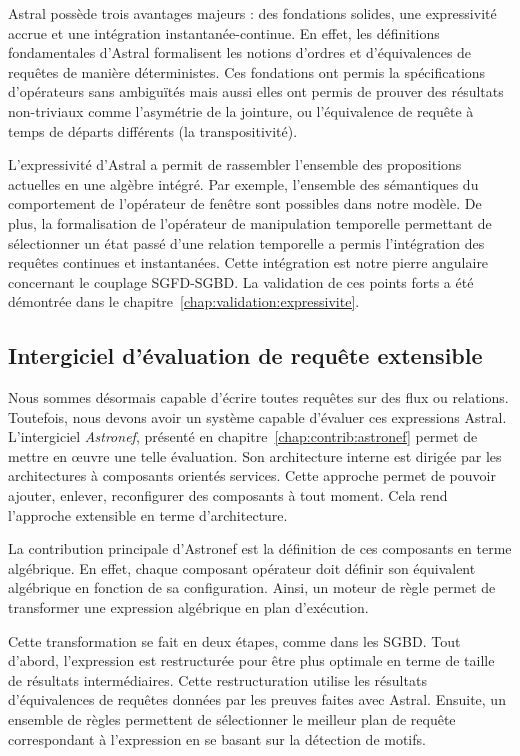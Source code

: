 Astral possède trois avantages majeurs : des fondations solides, une expressivité accrue et une intégration instantanée-continue. En effet, les définitions fondamentales d'Astral formalisent les notions d'ordres et d'équivalences de requêtes de manière déterministes. Ces fondations ont permis la spécifications d'opérateurs sans ambiguïtés mais aussi elles ont permis de prouver des résultats non-triviaux comme l'asymétrie de la jointure, ou l'équivalence de requête à temps de départs différents (la transpositivité).

L'expressivité d'Astral a permit de rassembler l'ensemble des propositions actuelles en une algèbre intégré. Par exemple, l'ensemble des sémantiques du comportement de l'opérateur de fenêtre sont possibles dans notre modèle. De plus, la formalisation de l'opérateur de manipulation temporelle permettant de sélectionner un état passé d'une relation temporelle a permis l'intégration des requêtes continues et instantanées. Cette intégration est notre pierre angulaire concernant le couplage SGFD-SGBD. La validation de ces points forts a été démontrée dans le chapitre~\ref{chap:validation:expressivite}.

\subsection{Intergiciel d'évaluation de requête extensible}
Nous sommes désormais capable d'écrire toutes requêtes sur des flux ou relations. Toutefois, nous devons avoir un système capable d'évaluer ces expressions Astral. L'intergiciel \textit{Astronef}, présenté en chapitre~\ref{chap:contrib:astronef} permet de mettre en œuvre une telle évaluation. Son architecture interne est dirigée par les architectures à composants orientés services. Cette approche permet de pouvoir ajouter, enlever, reconfigurer des composants à tout moment. Cela rend l'approche extensible en terme d'architecture.

La contribution principale d'Astronef est la définition de ces composants en terme algébrique. En effet, chaque composant opérateur doit définir son équivalent algébrique en fonction de sa configuration. Ainsi, un moteur de règle permet de transformer une expression algébrique en plan d'exécution.

Cette transformation se fait en deux étapes, comme dans les SGBD. Tout d'abord, l'expression est restructurée pour être plus optimale en terme de taille de résultats intermédiaires. Cette restructuration utilise les résultats d'équivalences de requêtes données par les preuves faites avec Astral. Ensuite, un ensemble de règles permettent de sélectionner le meilleur plan de requête correspondant à l'expression en se basant sur la détection de motifs.

